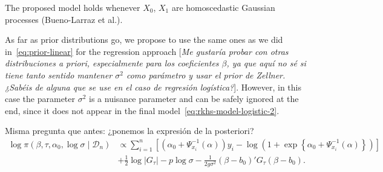 \documentclass[ba]{imsart}
\numberwithin{equation}{section}
\theoremstyle{plain}
\newenvironment{comment}
{
\noindent \em \color{red}
}
{
\color{black}
}
\newcommand\incomment[1]{\color{red}[\textit{#1}]\color{black}}
\begin{document}
\begin{comment}
  The proposed model holds whenever \(X_0\), \(X_1\) are homoscedastic Gaussian processes (Bueno-Larraz et al.).
\end{comment}

As far as prior distributions go, we propose to use the same ones as we did in~\eqref{eq:prior-linear} for the regression approach \incomment{Me gustaría probar con otras distribuciones a priori, especialmente para los coeficientes \(\beta\), ya que aquí no sé si tiene tanto sentido mantener \(\sigma^2\) como parámetro y usar el prior de Zellner. ¿Sabéis de alguna que se use en el caso de regresión logística?}. However, in this case the parameter \(\sigma^2\) is a nuisance parameter and can be safely ignored at the end, since it does not appear in the final model~\eqref{eq:rkhs-model-logistic-2}.

\begin{comment}
  Misma pregunta que antes: ¿ponemos la expresión de la posteriori?
  \begin{align*}
\log \pi(\beta, \tau, \alpha_0, \log\sigma\mid \mathcal D_n) & \propto \sum_{i=1}^n \left[ \left(\alpha_0 + \Psi^{-1}_{x_i}(\alpha)\right)y_i - \log\left(1 + \exp\left\{\alpha_0 + \Psi_{x_i}^{-1}(\alpha)\right\}\right)\right]\\
\quad &+ \frac{1}{2}\log |G_\tau| - p\log \sigma -\frac{1}{2g\sigma^2} (\beta - b_0)'G_\tau(\beta - b_0).
\end{align*}

\end{comment}
\end{document}
